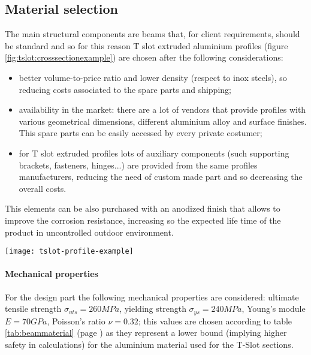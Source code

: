 \subsection{Material selection}
	
	The main structural components are beams that, for client requirements, should be standard and so for this reason T slot extruded aluminium profiles (figure \ref{fig:tslot:crosssectionexample}) are chosen after the following considerations:
	\begin{itemize}
		\item better volume-to-price ratio and lower density (respect to inox steels), so reducing costs associated to the spare parts and shipping;
		\item availability in the market: there are a lot of vendors that provide profiles with various geometrical dimensions, different aluminium alloy and surface finishes. This spare parts can be easily accessed by every private costumer;
		\item for T slot extruded profiles lots of auxiliary components (such supporting brackets, fasteners, hinges...)  are provided from the same profiles manufacturers, reducing the need of custom made part and so decreasing the overall costs.
	\end{itemize}

	This elements can be also purchased with an anodized finish that allows to improve the corrosion resistance, increasing so the expected life time of the product in uncontrolled outdoor environment.
	
	\begin{SCfigure}[1.5][bh]
		\centering\texttt{[image: tslot-profile-example]}
		\caption{technical drawing of a T-slot profile's cross-section. The particular sketch represent the model \texttt{TS40-40LM} by Tslots \cite{tslot-ds}.}
		\label{fig:tslot:crosssectionexample}
	\end{SCfigure}
	
	\paragraph{Mechanical properties} For the design part the following mechanical properties are considered: ultimate tensile strength $\sigma_{uts} = 260 MPa$, yielding strength $\sigma_{ys} = 240 MPa$, Young's module $E = 70 GPa$, Poisson's ratio $\nu = 0.32$; this values are chosen according to table \ref{tab:beammaterial} (page \pageref{tab:beammaterial}) as  they represent a lower bound (implying higher safety in calculations) for the aluminium material used for the T-Slot sections.
	
	
	
		
	
	
	
	
	
	
	
	
	
	
	
	
	
